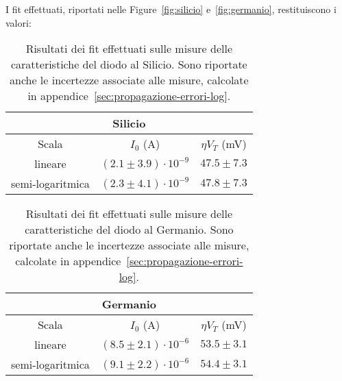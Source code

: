 \documentclass[@SRC@/main]{subfiles}
\begin{document}
    \noindent I fit effettuati, riportati nelle Figure~\ref{fig:silicio} e~\ref{fig:germanio}, restituiscono i valori:
    \vspace{0.2cm}
    \begin{table}[ht]
      \centering
      \begin{tabular}{||c|c|c||}
        \hline
        \multicolumn{3}{||c||}{Silicio} \\
        \hline
        Scala            & $I_0$ (\textnormal{A})       & $\eta V_T$ (\textnormal{mV}) \\
        \hline
        lineare          & $(2.1\pm3.9)\cdot 10^{-9}$   & $47.5\pm7.3$                 \\
        \hline
        semi-logaritmica & $(2.3 \pm 4.1)\cdot 10^{-9}$ & $47.8\pm 7.3$                \\
        \hline
      \end{tabular}
      \caption{Risultati dei fit effettuati sulle misure delle caratteristiche del diodo
      al Silicio. Sono riportate anche le incertezze associate alle misure, calcolate in
      appendice~\ref{sec:propagazione-errori-log}.}
      \label{tab:fit-silicio}
    \end{table}

    \begin{table}[ht]
      \centering
      \begin{tabular}{||c|c|c||}
        \hline
        \multicolumn{3}{||c||}{Germanio} \\
        \hline
        Scala            & $I_0$ (\textnormal{A})       & $\eta V_T $ (\textnormal{mV}) \\
        \hline
        lineare          & $(8.5\pm2.1) \cdot 10^{-6}$  & $53.5\pm3.1$                  \\
        \hline
        semi-logaritmica & $(9.1\pm 2.2) \cdot 10^{-6}$ & $54.4\pm3.1$                  \\
        \hline
      \end{tabular}
      \caption{Risultati dei fit effettuati sulle misure delle caratteristiche del diodo
      al Germanio. Sono riportate anche le incertezze associate alle misure, calcolate in
      appendice~\ref{sec:propagazione-errori-log}.}
      \label{tab:fit-germanio}
    \end{table}

\end{document}
